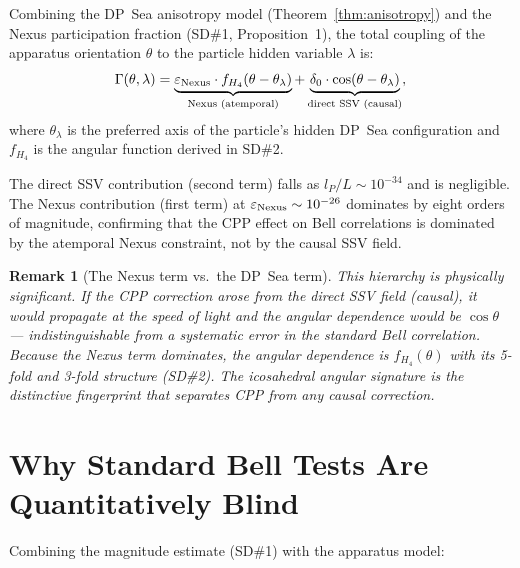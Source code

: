 \documentclass[11pt,letterpaper]{article}
\newtheorem{remark}[theorem]{Remark}
\newcommand{\lP}{l_P}
\newcommand{\eps}{\varepsilon}
\begin{document}
Combining the DP~Sea anisotropy model (Theorem~\ref{thm:anisotropy})
and the Nexus participation fraction (SD\#1, Proposition~1), the
total coupling of the apparatus orientation $\theta$ to the particle
hidden variable $\lambda$ is:
\begin{equation}
\Gamma(\theta, \lambda)
= \underbrace{\eps_{\rm Nexus} \cdot f_{H_4}(\theta - \theta_\lambda)}
             _{\text{Nexus (atemporal)}}
+ \underbrace{\delta_0 \cdot \cos(\theta - \theta_\lambda)}
             _{\text{direct SSV (causal)}},
\label{eq:Gamma_total}
\end{equation}
where $\theta_\lambda$ is the preferred axis of the particle's
hidden DP~Sea configuration and $f_{H_4}$ is the angular function
derived in SD\#2.

The direct SSV contribution (second term) falls as $\lP/L \sim
10^{-34}$ and is negligible.  The Nexus contribution (first term)
at $\eps_{\rm Nexus} \sim 10^{-26}$ dominates by eight orders of
magnitude, confirming that the CPP effect on Bell correlations is
dominated by the atemporal Nexus constraint, not by the causal
SSV field.

\begin{remark}[The Nexus term vs.\ the DP~Sea term]
This hierarchy is physically significant.  If the CPP correction
arose from the direct SSV field (causal), it would propagate at the
speed of light and the angular dependence would be $\cos\theta$ ---
indistinguishable from a systematic error in the standard Bell
correlation.  Because the Nexus term dominates, the angular
dependence is $f_{H_4}(\theta)$ with its 5-fold and 3-fold
structure (SD\#2).  The icosahedral angular signature is the
distinctive fingerprint that separates CPP from any causal correction.
\end{remark}

\section{Why Standard Bell Tests Are Quantitatively Blind}
\label{sec:why_blind}

Combining the magnitude estimate (SD\#1) with the apparatus model:
\end{document}
